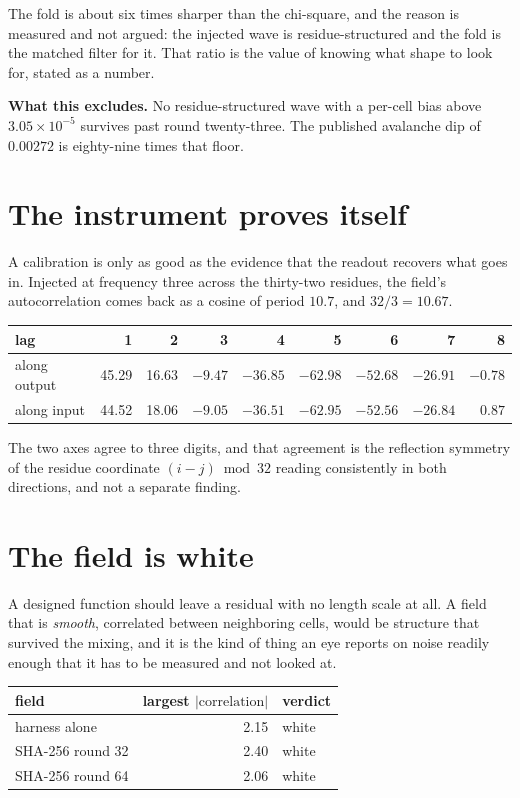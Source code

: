 The fold is about six times sharper than the chi-square, and the reason is measured and not argued:
the injected wave is residue-structured and the fold is the matched filter for it. That ratio is
the value of knowing what shape to look for, stated as a number.

\textbf{What this excludes.} No residue-structured wave with a per-cell bias above
\(3.05 \times 10^{-5}\) survives past round twenty-three. The published avalanche dip of
\(0.00272\) is eighty-nine times that floor.

\section{The instrument proves itself}

A calibration is only as good as the evidence that the readout recovers what goes in. Injected at
frequency three across the thirty-two residues, the field's autocorrelation comes back as a cosine
of period \(10.7\), and \(32/3 = 10.67\).

\begin{center}
\begin{tabular}{lrrrrrrrr}
\toprule
lag & 1 & 2 & 3 & 4 & 5 & 6 & 7 & 8 \\
\midrule
along output & 45.29 & 16.63 & \(-9.47\) & \(-36.85\) & \(-62.98\) & \(-52.68\) & \(-26.91\) & \(-0.78\) \\
along input & 44.52 & 18.06 & \(-9.05\) & \(-36.51\) & \(-62.95\) & \(-52.56\) & \(-26.84\) & \(0.87\) \\
\bottomrule
\end{tabular}
\end{center}

The two axes agree to three digits, and that agreement is the reflection symmetry of the residue coordinate
\((i - j) \bmod 32\) reading consistently in both directions, and not a separate finding.

\section{The field is white}

A designed function should leave a residual with no length scale at all. A field that is
\emph{smooth}, correlated between neighboring cells, would be structure that survived the
mixing, and it is the kind of thing an eye reports on noise readily enough that it has to be
measured and not looked at.

\begin{center}
\begin{tabular}{lrl}
\toprule
field & largest \(|\text{correlation}|\) & verdict \\
\midrule
harness alone & 2.15 & white \\
SHA-256 round 32 & 2.40 & white \\
SHA-256 round 64 & 2.06 & white \\
\bottomrule
\end{tabular}
\end{center}

